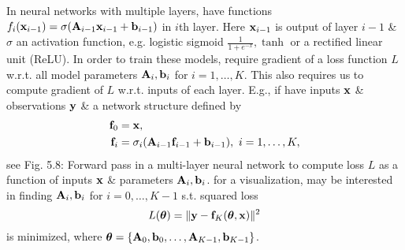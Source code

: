 \documentclass{article}
\begin{document}
\begin{enumerate}
\begin{itemize}
\begin{itemize}
\begin{itemize}
				In neural networks with multiple layers, have functions $f_i({\bf x}_{i-1}) = \sigma({\bf A}_{i-1}{\bf x}_{i-1} + {\bf b}_{i-1})$ in $i$th layer. Here ${\bf x}_{i-1}$ is output of layer $i - 1$ \& $\sigma$ an activation function, e.g. logistic sigmoid $\frac{1}{1 + e^{-x}},\tanh$ or a rectified linear unit (ReLU). In order to train these models, require gradient of a loss function $L$ w.r.t. all model parameters ${\bf A}_i,{\bf b}_i$ for $i = 1,\ldots,K$. This also requires us to compute gradient of $L$ w.r.t. inputs of each layer. E.g., if have inputs ${\bf x}$ \& observations ${\bf y}$ \& a network structure defined by
				\begin{align}
					{\bf f}_0 &= {\bf x},\\
					{\bf f}_i &= \sigma_i({\bf A}_{i-1}{\bf f}_{i-1} + {\bf b}_{i-1}),\ i = 1,\ldots,K,
				\end{align}
				see {\sf Fig. 5.8: Forward pass in a multi-layer neural network to compute loss $L$ as a function of inputs ${\bf x}$ \& parameters ${\bf A}_i,{\bf b}_i$.} for a visualization, may be interested in finding ${\bf A}_i,{\bf b}_i$ for $i = 0,\ldots,K - 1$ s.t. squared loss
				\begin{equation}
					L(\boldsymbol{\theta}) = \|{\bf y} - {\bf f}_K(\boldsymbol{\theta},{\bf x})\|^2
				\end{equation}
				is minimized, where $\boldsymbol{\theta} = \{{\bf A}_0,{\bf b}_0,\ldots,{\bf A}_{K-1},{\bf b}_{K-1}\}$.
				

\end{itemize}
\end{itemize}
\end{itemize}
\end{enumerate}
\end{document}
